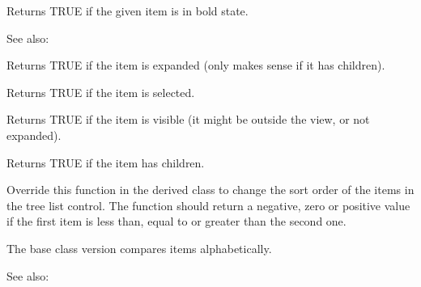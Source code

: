 \label{wxtreelistctrlisbold}


Returns TRUE if the given item is in bold state.

See also: 

\label{wxtreelistctrlisexpanded}


Returns TRUE if the item is expanded (only makes sense if it has children).

\label{wxtreelistctrlisselected}


Returns TRUE if the item is selected.

\label{wxtreelistctrlisvisible}


Returns TRUE if the item is visible (it might be outside the view, or not expanded).

\label{wxtreelistctrlitemhaschildren}


Returns TRUE if the item has children.

\label{wxtreelistctrloncompareitems}


Override this function in the derived class to change the sort order of the
items in the tree list control. The function should return a negative, zero or
positive value if the first item is less than, equal to or greater than the
second one.

The base class version compares items alphabetically.

See also: 

\label{wxtreelistctrlprependitem}


